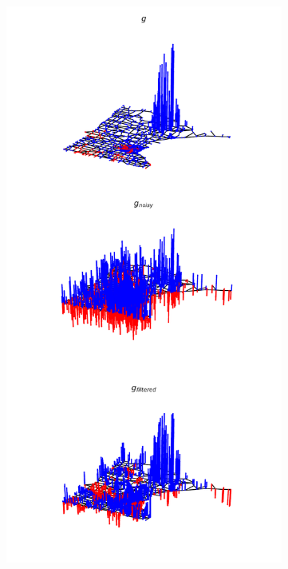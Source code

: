 \documentclass{beamer}
\begin{document}
\begin{frame}
\begin{columns}
\begin{column}{0.5\textwidth}
\begin{figure}
\end{figure}
  \end{column}
    \begin{column}{0.5\textwidth}
\begin{figure}
\includegraphics[trim={0 0 0 20cm},clip,width=\linewidth]{../img/basic_operations_1.pdf}
\end{figure}
  \end{column}
  \end{columns}
\end{frame}
\end{document}

